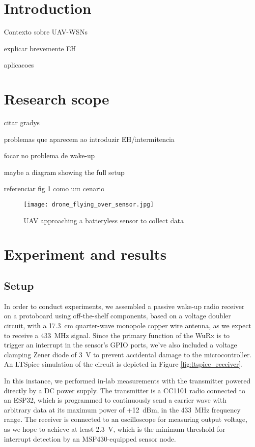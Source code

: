 \documentclass[conference]{IEEEtran}
\begin{document}
\section{Introduction}

Contexto sobre UAV-WSNs

explicar brevemente EH

aplicacoes


\section{Research scope}

citar gradys

problemas que aparecem ao introduzir EH/intermitencia

focar no problema de wake-up

maybe a diagram showing the full setup

referenciar fig 1 como um cenario

\begin{figure}[htbp]
  \centerline{\texttt{[image: drone\_flying\_over\_sensor.jpg]}}
  \caption{UAV approaching a batteryless sensor to collect data}
  \label{fig:drone_over_sensor}
\end{figure}


\section{Experiment and results}

\subsection{Setup}

In order to conduct experiments, we assembled a passive wake-up radio receiver on a protoboard using off-the-shelf components, based on a voltage doubler circuit, with a 17.3~cm quarter-wave monopole copper wire antenna, as we expect to receive a 433~MHz signal. Since the primary function of the WuRx is to trigger an interrupt in the sensor's GPIO ports, we've also included a voltage clamping Zener diode of 3~V to prevent accidental damage to the microcontroller. An LTSpice simulation of the circuit is depicted in Figure \ref{fig:ltspice_receiver}.

In this instance, we performed in-lab measurements with the transmitter powered directly by a DC power supply. The transmitter is a CC1101 radio connected to an ESP32, which is programmed to continuously send a carrier wave with arbitrary data at its maximum power of +12~dBm, in the 433~MHz frequency range. The receiver is connected to an oscilloscope for measuring output voltage, as we hope to achieve at least 2.3~V, which is the minimum threshold for interrupt detection by an MSP430-equipped sensor node.
\end{document}

